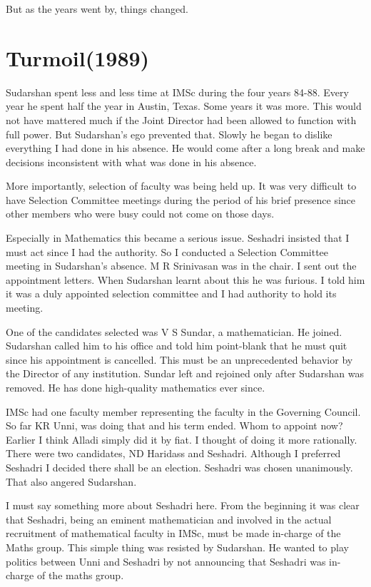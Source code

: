 But as the years went by, things changed.

\section*{Turmoil(1989)}

Sudarshan spent less and less time at IMSc during the four years 84-88. 
Every year he spent half the year in Austin, Texas. Some years it was 
more. This would not have mattered much if the Joint Director had been 
allowed to function with full power. But Sudarshan's ego prevented that. 
Slowly he began to dislike everything I had done in his absence. He 
would come after a long break and make decisions inconsistent with what 
was done in his absence.

More importantly, selection of faculty was being held up. It was very 
difficult to have Selection Committee meetings during the period of his 
brief presence since other members who were busy could not come on those 
days.

Especially in Mathematics this became a serious issue. Seshadri insisted 
that I must act since I had the authority. So I conducted a Selection 
Committee meeting in Sudarshan's absence. M R Srinivasan was in the 
chair. I sent out the appointment letters. When Sudarshan learnt about 
this he was furious. I told him it was a duly appointed selection 
committee and I had authority to hold its meeting.

One of the candidates selected was V S Sundar, a mathematician. He 
joined. Sudarshan called him to his office and told him point-blank that 
he must quit since his appointment is cancelled. This must be an 
unprecedented behavior by the Director of any institution. Sundar left 
and rejoined only after Sudarshan was removed. He has done high-quality 
mathematics ever since.

IMSc had one faculty member representing the faculty in the Governing 
Council. So far KR Unni, was doing that and his term ended. Whom to 
appoint now? Earlier I think Alladi simply did it by fiat. I thought of 
doing it more rationally. There were two candidates, ND Haridass and 
Seshadri. Although I preferred Seshadri I decided there shall be an 
election. Seshadri was chosen unanimously. That also angered Sudarshan.

I must say something more about Seshadri here. From the beginning it was 
clear that Seshadri, being an eminent mathematician and involved in the 
actual recruitment of mathematical faculty in IMSc, must be made 
in-charge of the Maths group. This simple thing was resisted by 
Sudarshan. He wanted to play politics between Unni and Seshadri by not 
announcing that Seshadri was in-charge of the maths group.

